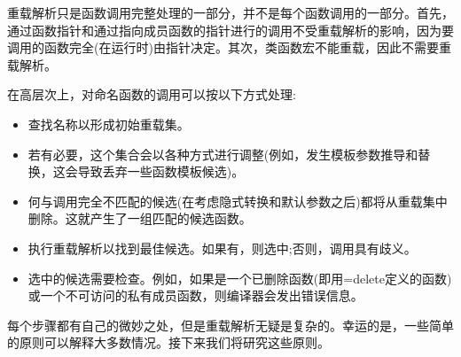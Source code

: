 重载解析只是函数调用完整处理的一部分，并不是每个函数调用的一部分。首先，通过函数指针和通过指向成员函数的指针进行的调用不受重载解析的影响，因为要调用的函数完全(在运行时)由指针决定。其次，类函数宏不能重载，因此不需要重载解析。

在高层次上，对命名函数的调用可以按以下方式处理:

\begin{itemize}
\item 
查找名称以形成初始重载集。

\item 
若有必要，这个集合会以各种方式进行调整(例如，发生模板参数推导和替换，这会导致丢弃一些函数模板候选)。

\item 
何与调用完全不匹配的候选(在考虑隐式转换和默认参数之后)都将从重载集中删除。这就产生了一组匹配的候选函数。

\item 
执行重载解析以找到最佳候选。如果有，则选中;否则，调用具有歧义。

\item 
选中的候选需要检查。例如，如果是一个已删除函数(即用=delete定义的函数)或一个不可访问的私有成员函数，则编译器会发出错误信息。
\end{itemize}

每个步骤都有自己的微妙之处，但是重载解析无疑是复杂的。幸运的是，一些简单的原则可以解释大多数情况。接下来我们将研究这些原则。














































